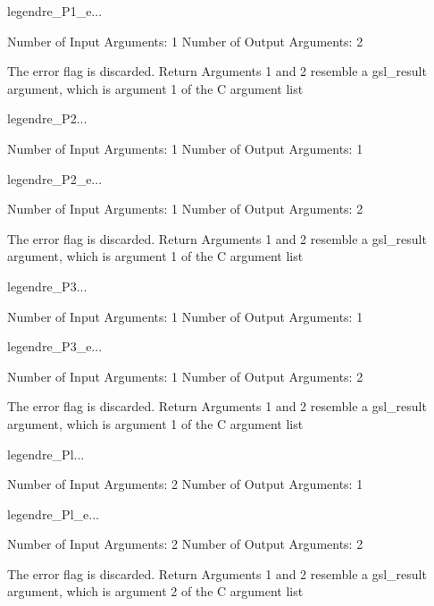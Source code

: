 \begin{funcdesc}{legendre_P1_e}{...}

    Number of Input  Arguments:  1
    Number of Output Arguments:  2

The error flag is discarded.
Return Arguments 1 and 2 resemble a gsl_result argument,
	which is  argument 1 of the C argument list

\end{funcdesc}

\begin{funcdesc}{legendre_P2}{...}

    Number of Input  Arguments:  1
    Number of Output Arguments:  1
\end{funcdesc}

\begin{funcdesc}{legendre_P2_e}{...}

    Number of Input  Arguments:  1
    Number of Output Arguments:  2

The error flag is discarded.
Return Arguments 1 and 2 resemble a gsl_result argument,
	which is  argument 1 of the C argument list

\end{funcdesc}

\begin{funcdesc}{legendre_P3}{...}

    Number of Input  Arguments:  1
    Number of Output Arguments:  1
\end{funcdesc}

\begin{funcdesc}{legendre_P3_e}{...}

    Number of Input  Arguments:  1
    Number of Output Arguments:  2

The error flag is discarded.
Return Arguments 1 and 2 resemble a gsl_result argument,
	which is  argument 1 of the C argument list

\end{funcdesc}

\begin{funcdesc}{legendre_Pl}{...}

    Number of Input  Arguments:  2
    Number of Output Arguments:  1
\end{funcdesc}

\begin{funcdesc}{legendre_Pl_e}{...}

    Number of Input  Arguments:  2
    Number of Output Arguments:  2

The error flag is discarded.
Return Arguments 1 and 2 resemble a gsl_result argument,
	which is  argument 2 of the C argument list

\end{funcdesc}

